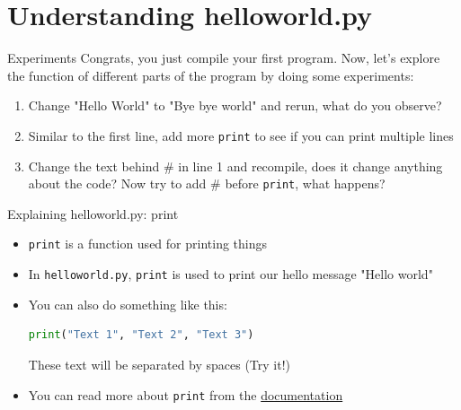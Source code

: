 \documentclass[10pt,xcolor={table,dvipsnames},t]{beamer}
\begin{document}
\section{Understanding helloworld.py}

\begin{frame}[fragile]{Experiments}
   Congrats, you just compile your first program. Now, let's explore the function of different parts of the program by doing some experiments:
  \begin{enumerate}
    \item Change "Hello World" to "Bye bye world" and rerun, what do you observe?
    \item Similar to the first line, add more \texttt{print} to see if you can print multiple lines
    \item Change the text behind \# in line 1 and recompile, does it change anything about the code? Now try to add \# before \texttt{print}, what happens?
  \end{enumerate}
\end{frame}

\begin{frame}[fragile]{Explaining helloworld.py: print}
  \begin{itemize}
    \item \texttt{print} is a function used for printing things
    \item In \texttt{helloworld.py}, \texttt{print} is used to print our hello message "Hello world"
    \item You can also do something like this:
\begin{lstlisting}[language=python]
  print("Text 1", "Text 2", "Text 3")
\end{lstlisting}
    These text will be separated by spaces (Try it!)
    \item You can read more about \texttt{print} from the \href{https://docs.python.org/3/library/functions.html#print}{documentation}
  \end{itemize}
\end{frame}
\end{document}
